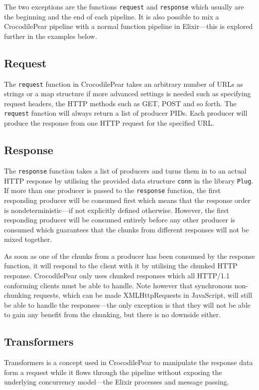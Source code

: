 \documentclass{cslthse-msc}
\begin{document}
The two exceptions are the functions \lstinline{request} and \lstinline{response} which usually are the beginning and the end of each pipeline. It is also possible to mix a CrocodilePear pipeline with a normal function pipeline in Elixir---this is explored further in the examples below.

\subsection{Request}
The \lstinline{request} function in CrocodilePear takes an arbitrary number of URLs as strings or a map structure if more advanced settings is needed such as specifying request headers, the HTTP methods such as GET, POST and so forth. The \lstinline{request} function will always return a list of producer PIDs. Each producer will produce the response from one HTTP request for the specified URL.

\subsection{Response}
The \lstinline{response} function takes a list of producers and turns them in to an actual HTTP response by utilising the provided data structure \lstinline{conn} in the library \lstinline{Plug}. If more than one producer is passed to the \lstinline{response} function, the first responding producer will be consumed first which means that the response order is nondeterministic---if not explicitly defined otherwise. However, the first responding producer will be consumed entirely before any other producer is consumed which guarantees that the chunks from different responses will not be mixed together.

As soon as one of the chunks from a producer has been consumed by the response function, it will respond to the client with it by utilising the chunked HTTP response. CrocodilePear only uses chunked responses which all HTTP/1.1 conforming clients must be able to handle\cite{chunked_required}. Note however that synchronous non-chunking requests, which can be made XMLHttpRequests in JavaScript, will still be able to handle the responses---the only exception is that they will not be able to gain any benefit from the chunking, but there is no downside either.

\subsection{Transformers}
Transformers is a concept used in CrocodilePear to manipulate the response data form a request while it flows through the pipeline without exposing the underlying concurrency model---the Elixir processes and message passing.
\end{document}
